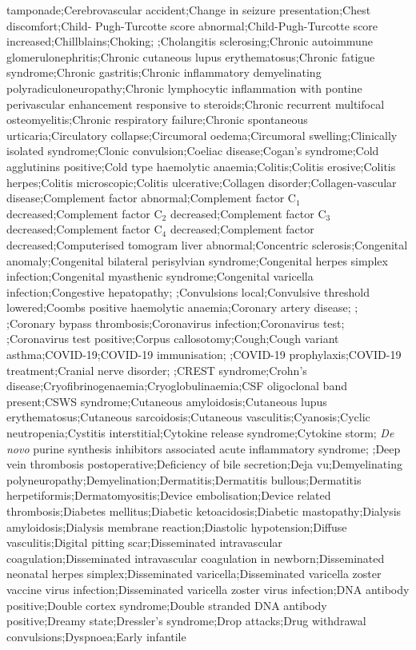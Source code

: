 \begin{refsection}
\begin{tcolorbox}[quote]
tamponade;Cerebrovascular accident;Change in seizure presentation;Chest discomfort;Child- Pugh-Turcotte score abnormal;Child-Pugh-Turcotte score increased;Chillblains;Choking; ;Cholangitis sclerosing;Chronic autoimmune glomerulonephritis;Chronic cutaneous lupus erythematosus;Chronic fatigue syndrome;Chronic gastritis;Chronic inflammatory demyelinating polyradiculoneuropathy;Chronic lymphocytic inflammation with pontine perivascular enhancement responsive to steroids;Chronic recurrent multifocal osteomyelitis;Chronic respiratory failure;Chronic spontaneous urticaria;Circulatory collapse;Circumoral oedema;Circumoral swelling;Clinically isolated syndrome;Clonic convulsion;Coeliac disease;Cogan's syndrome;Cold agglutinins positive;Cold type haemolytic anaemia;Colitis;Colitis erosive;Colitis herpes;Colitis microscopic;Colitis ulcerative;Collagen disorder;Collagen-vascular disease;Complement factor abnormal;Complement factor C$_{1}$ decreased;Complement factor C$_{2}$ decreased;Complement factor C$_{3}$ decreased;Complement factor C$_{4}$ decreased;Complement factor decreased;Computerised tomogram liver abnormal;Concentric sclerosis;Congenital anomaly;Congenital bilateral perisylvian syndrome;Congenital herpes simplex infection;Congenital myasthenic syndrome;Congenital varicella infection;Congestive hepatopathy; ;Convulsions local;Convulsive threshold lowered;Coombs positive haemolytic anaemia;Coronary artery disease; ; ;Coronary bypass thrombosis;Coronavirus infection;Coronavirus test; ;Coronavirus test positive;Corpus callosotomy;Cough;Cough variant asthma;COVID-19;COVID-19 immunisation; ;COVID-19 prophylaxis;COVID-19 treatment;Cranial nerve disorder; ;CREST syndrome;Crohn's disease;Cryofibrinogenaemia;Cryoglobulinaemia;CSF oligoclonal band present;CSWS syndrome;Cutaneous amyloidosis;Cutaneous lupus erythematosus;Cutaneous sarcoidosis;Cutaneous vasculitis;Cyanosis;Cyclic neutropenia;Cystitis interstitial;Cytokine release syndrome;Cytokine storm; \textit{De novo} purine synthesis inhibitors associated acute inflammatory syndrome; ;Deep vein thrombosis postoperative;Deficiency of bile secretion;Deja vu;Demyelinating polyneuropathy;Demyelination;Dermatitis;Dermatitis bullous;Dermatitis herpetiformis;Dermatomyositis;Device embolisation;Device related thrombosis;Diabetes mellitus;Diabetic ketoacidosis;Diabetic mastopathy;Dialysis amyloidosis;Dialysis membrane reaction;Diastolic hypotension;Diffuse vasculitis;Digital pitting scar;Disseminated intravascular coagulation;Disseminated intravascular coagulation in newborn;Disseminated neonatal herpes simplex;Disseminated varicella;Disseminated varicella zoster vaccine virus infection;Disseminated varicella zoster virus infection;DNA antibody positive;Double cortex syndrome;Double stranded DNA antibody positive;Dreamy state;Dressler's syndrome;Drop attacks;Drug withdrawal convulsions;Dyspnoea;Early infantile 
\end{tcolorbox}
\end{refsection}

